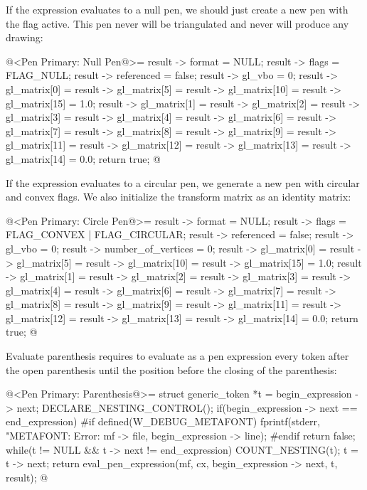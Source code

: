 If the expression evaluates to a null pen, we should just create a new
pen with the flag  active. This pen never will
be triangulated and never will produce any drawing:

\iniciocodigo
@<Pen Primary: Null Pen@>=
result -> format = NULL;
result -> flags = FLAG_NULL;
result -> referenced = false;
result -> gl_vbo = 0;
result -> gl_matrix[0] = result -> gl_matrix[5] = result -> gl_matrix[10] =
                         result -> gl_matrix[15] = 1.0; 
result -> gl_matrix[1] = result -> gl_matrix[2] = result -> gl_matrix[3] = 
                         result -> gl_matrix[4] = result -> gl_matrix[6] =
                         result -> gl_matrix[7] = result -> gl_matrix[8] = 
                         result -> gl_matrix[9] = result -> gl_matrix[11] =
                         result -> gl_matrix[12] = result -> gl_matrix[13] =
                         result -> gl_matrix[14] = 0.0;
return true;
@
\fimcodigo

If the expression evaluates to a circular pen, we generate a new pen
with circular and convex flags. We also initialize the transform
matrix as an identity matrix:

\iniciocodigo
@<Pen Primary: Circle Pen@>=
result -> format = NULL;
result -> flags = FLAG_CONVEX | FLAG_CIRCULAR;
result -> referenced = false;
result -> gl_vbo = 0;
result -> number_of_vertices = 0;
result -> gl_matrix[0] = result -> gl_matrix[5] = result -> gl_matrix[10] =
                         result -> gl_matrix[15] = 1.0; 
result -> gl_matrix[1] = result -> gl_matrix[2] = result -> gl_matrix[3] = 
                         result -> gl_matrix[4] = result -> gl_matrix[6] =
                         result -> gl_matrix[7] = result -> gl_matrix[8] = 
                         result -> gl_matrix[9] = result -> gl_matrix[11] =
                         result -> gl_matrix[12] = result -> gl_matrix[13] =
                         result -> gl_matrix[14] = 0.0;
return true;
@
\fimcodigo

Evaluate parenthesis requires to evaluate as a pen expression every
token after the open parenthesis until the position before the closing
of the parenthesis:

\iniciocodigo
@<Pen Primary: Parenthesis@>=
struct generic_token *t = begin_expression -> next;
DECLARE_NESTING_CONTROL();
if(begin_expression -> next == end_expression){
#if defined(W_DEBUG_METAFONT)
  fprintf(stderr, "METAFONT: Error: %
          mf -> file, begin_expression -> line);
#endif
  return false;
}
while(t != NULL && t -> next != end_expression){
  COUNT_NESTING(t);
  t = t -> next;
}
return eval_pen_expression(mf, cx, begin_expression -> next, t, result);
@
\fimcodigo

